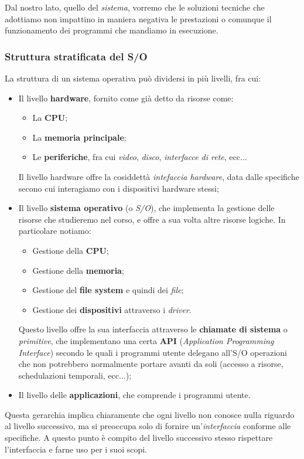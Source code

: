 \documentclass[a4paper,11pt]{article}
\begin{document}
Dal nostro lato, quello del \textit{sistema}, vorremo che le soluzioni tecniche che adottiamo non impattino in maniera negativa le prestazioni o comunque il funzionamento dei programmi che mandiamo in esecuzione.

\subsubsection{Struttura stratificata del S/O}
La struttura di un sistema operativa può dividersi in più livelli, fra cui:
\begin{itemize}
	\item Il livello \textbf{hardware}, fornito come già detto da risorse come:
		\begin{itemize}
			\item La \textbf{CPU};
			\item La \textbf{memoria principale};
			\item Le \textbf{periferiche}, fra cui \textit{video}, \textit{disco}, \textit{interfacce di rete}, ecc...
		\end{itemize}
		Il livello hardware offre la cosiddettà \textit{intefaccia hardware}, data dalle specifiche secono cui interagiamo con i dispositivi hardware stessi;
	\item Il livello \textbf{sistema operativo} (o \textit{S/O}), che implementa la gestione delle risorse che studieremo nel corso, e offre a sua volta altre risorse logiche. In particolare notiamo:
		\begin{itemize}
			\item Gestione della \textbf{CPU};
			\item Gestione della \textbf{memoria};
			\item Gestione del \textbf{file system} e quindi dei \textit{file};
			\item Gestione dei \textbf{dispositivi} attraverso i \textit{driver}.
		\end{itemize}
		Questo livello offre la sua interfaccia attraverso le \textbf{chiamate di sistema} o \textit{primitive}, che implementano una certa \textbf{API} (\textit{Application Programming Interface}) secondo le quali i programmi utente delegano all'S/O operazioni che non potrebbero normalmente portare avanti da soli (accesso a risorse, schedulazioni temporali, ecc...);
	\item Il livello delle \textbf{applicazioni}, che comprende i programmi utente.
\end{itemize}

Questa gerarchia implica chiaramente che ogni livello non conosce nulla riguardo al livello successivo, ma si preoccupa solo di fornire un'\textit{interfaccia} conforme alle specifiche. A questo punto è compito del livello successivo stesso rispettare l'interfaccia e farne uso per i suoi scopi.
\end{document}
